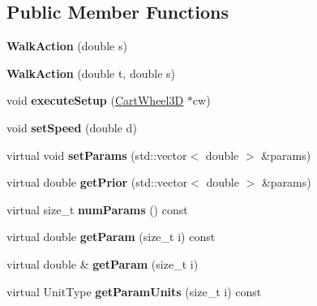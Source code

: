 \subsection*{Public Member Functions}
\begin{DoxyCompactItemize}
\item 
\hypertarget{classCartWheel_1_1WalkAction_af9600304f46b6d46b50f2fa61b5e6003}{
{\bfseries WalkAction} (double s)}
\label{classCartWheel_1_1WalkAction_af9600304f46b6d46b50f2fa61b5e6003}

\item 
\hypertarget{classCartWheel_1_1WalkAction_a4815ab2101f063b10fb9ffde14e43c8d}{
{\bfseries WalkAction} (double t, double s)}
\label{classCartWheel_1_1WalkAction_a4815ab2101f063b10fb9ffde14e43c8d}

\item 
\hypertarget{classCartWheel_1_1WalkAction_a2065cc98b66543500bf73d7ef00e66cb}{
void {\bfseries executeSetup} (\hyperlink{classCartWheel_1_1CartWheel3D}{CartWheel3D} $\ast$cw)}
\label{classCartWheel_1_1WalkAction_a2065cc98b66543500bf73d7ef00e66cb}

\item 
\hypertarget{classCartWheel_1_1WalkAction_a8a42fb2eb849710fc58299a7f3e31d6d}{
void {\bfseries setSpeed} (double d)}
\label{classCartWheel_1_1WalkAction_a8a42fb2eb849710fc58299a7f3e31d6d}

\item 
\hypertarget{classCartWheel_1_1WalkAction_a33b06e8f256ede4b74261f7dbc965181}{
virtual void {\bfseries setParams} (std::vector$<$ double $>$ \&params)}
\label{classCartWheel_1_1WalkAction_a33b06e8f256ede4b74261f7dbc965181}

\item 
\hypertarget{classCartWheel_1_1WalkAction_a316106eec0769f7faa7c067ce440b988}{
virtual double {\bfseries getPrior} (std::vector$<$ double $>$ \&params)}
\label{classCartWheel_1_1WalkAction_a316106eec0769f7faa7c067ce440b988}

\item 
\hypertarget{classCartWheel_1_1WalkAction_a546c700b58b09f8e22a720a1de22fcb5}{
virtual size\_\-t {\bfseries numParams} () const }
\label{classCartWheel_1_1WalkAction_a546c700b58b09f8e22a720a1de22fcb5}

\item 
\hypertarget{classCartWheel_1_1WalkAction_affb41cd090e5d0700f25cf971e5818be}{
virtual double {\bfseries getParam} (size\_\-t i) const }
\label{classCartWheel_1_1WalkAction_affb41cd090e5d0700f25cf971e5818be}

\item 
\hypertarget{classCartWheel_1_1WalkAction_a2ae7cca52a20913ea965a63618583400}{
virtual double \& {\bfseries getParam} (size\_\-t i)}
\label{classCartWheel_1_1WalkAction_a2ae7cca52a20913ea965a63618583400}

\item 
\hypertarget{classCartWheel_1_1WalkAction_ad9af4fbee200605076482d7ca6452c7c}{
virtual UnitType {\bfseries getParamUnits} (size\_\-t i) const }
\label{classCartWheel_1_1WalkAction_ad9af4fbee200605076482d7ca6452c7c}

\end{DoxyCompactItemize}
